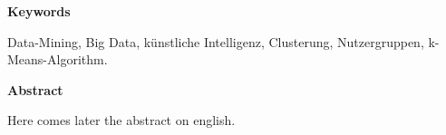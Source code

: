 {\Large \textbf{Keywords}}\vspace{0.1cm}

Data-Mining, Big Data, künstliche Intelligenz, Clusterung, Nutzergruppen, k-Means-Algorithm.\vspace{0.5cm}

{\Large \textbf{Abstract}}\vspace{0.1cm}

Here comes later the abstract on english.
